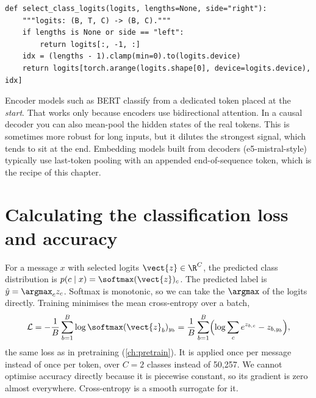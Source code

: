 \begin{lstlisting}[caption={Selecting the per-message logits.},label={lst:classify:select}]
def select_class_logits(logits, lengths=None, side="right"):
    """logits: (B, T, C) -> (B, C)."""
    if lengths is None or side == "left":
        return logits[:, -1, :]
    idx = (lengths - 1).clamp(min=0).to(logits.device)
    return logits[torch.arange(logits.shape[0], device=logits.device), idx]
\end{lstlisting}

\begin{deepdive}
Encoder models such as BERT classify from a dedicated \code{[CLS]} token placed at the
\emph{start}. That works only because encoders use bidirectional attention. In a causal
decoder you can also mean-pool the hidden states of the real tokens. This is sometimes
more robust for long inputs, but it dilutes the strongest signal, which tends to sit at
the end. Embedding models built from decoders (e5-mistral-style) typically use
last-token pooling with an appended end-of-sequence token, which is the recipe of this
chapter.
\end{deepdive}

\section{Calculating the classification loss and accuracy}\label{sec:classify:loss}

For a message $x$ with selected logits $\vect{z}\in\R^{C}$, the predicted class
distribution is $p(c\mid x) = \softmax(\vect{z})_c$. The predicted label is
$\hat{y} = \argmax_c z_c$. Softmax is monotonic, so we can take the $\argmax$ of the
logits directly. Training minimises the mean cross-entropy over a batch,
\begin{equation}
\mathcal{L} = -\frac{1}{B}\sum_{b=1}^{B} \log \softmax(\vect{z}_b)_{y_b}
            = \frac{1}{B}\sum_{b=1}^{B}\Bigl(\log\sum_{c} e^{z_{b,c}} - z_{b,y_b}\Bigr),
\label{eq:classify:ce}
\end{equation}
the same loss as in pretraining (\cref{ch:pretrain}). It is applied once per message
instead of once per token, over $C=2$ classes instead of 50{,}257. We cannot optimise
accuracy directly because it is piecewise constant, so its gradient is zero almost
everywhere. Cross-entropy is a smooth surrogate for it.

